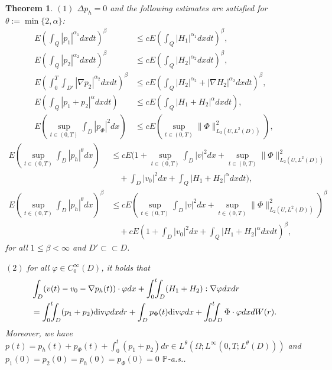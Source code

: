 \documentclass[reqno]{amsart}
\newtheorem{Theorem}{Theorem}[section]
\theoremstyle{definition}
\theoremstyle{remark}
\numberwithin{equation}{section} \allowdisplaybreaks
\begin{document}
\begin{Theorem}
 $(1)$ $\Delta p_h=0$ and the following estimates are satisfied for
$\theta:=\min\{2,\alpha\}$:
\begin{align*} E\left(
\int_Q|p_1|^{\alpha_1}dxdt\right)^\beta&\leq cE\left(
\int_Q|H_1|^{\alpha_1}dxdt\right)^\beta,\\
E\left(\int_Q|p_2|^{\alpha_2}dxdt\right)^\beta&\leq cE\left(
\int_Q|H_2|^{\alpha_2}dxdt\right)^\beta,\\
E\left(\int_0^T\!\!\!\int_{D'}|\nabla
p_2|^{\alpha_2}dxdt\right)^\beta&\leq cE\left(
\int_Q|H_2|^{\alpha_2}+|\nabla H_2|^{\alpha_2}dxdt\right)^\beta,\\
E\left(\int_Q|p_1+p_2|^{\alpha}dxdt\right)&\leq cE\left(
\int_Q|H_1+H_2|^{\alpha}dxdt\right),\\
E\left(\sup_{t\in(0,T)} \int_{D}|p_\Phi|^{2}dx\right)&\leq cE\left(
\sup_{t\in(0,T)}\|\Phi\|^2_{L_2({U},L^2(D))}\right),
\end{align*}
\begin{align*}
E\left(\sup_{t\in(0,T)} \int_{D}|p_h|^{\theta}dx\right)&\leq
cE\bigg( 1+\sup_{t\in(0,T)} \int_{D}|v|^{2}dx
+\sup_{t\in(0,T)}\|\Phi\|^2_{L_2({U},L^2(D))}\\
&\quad+\int_{D}|v_0|^{2}dx+\int_Q|H_1+H_2|^{\alpha}dxdt\bigg),\\
E\left(\sup_{t\in(0,T)} \int_{D}|p_h|^{\theta}dx\right)^\beta&\leq
cE\left(\sup_{t\in(0,T)} \int_{D}|v|^{2}dx
+\sup_{t\in(0,T)}\|\Phi\|^2_{L_2({U},L^2(D))}\right)^\beta\\
&\quad+cE\left(1+\int_{D}|v_0|^{2}dx+\int_Q|H_1+H_2|^{\alpha}dxdt\right)^\beta,
\end{align*}
for all $1\leq\beta<\infty$ and $D'\subset\subset D$.

$(2)$ for all $\varphi\in C_0^\infty(D)$, it holds that
\begin{equation*}
\begin{split}
&\int_{D}(v(t)-v_0-\nabla p_h(t))\cdot\varphi dx+\int_0^t\!\!\!\int_{D}(H_1+H_2):\nabla\varphi dxdr\\
&=\int_0^t\!\!\!\int_{D}(p_1+p_2){\rm{div}\varphi}
dxdr+\int_{D}p_\Phi(t){\rm{div}\varphi}
dx+\int_0^t\!\!\!\int_{D}\Phi \cdot\varphi dxdW(r).
\end{split}
\end{equation*}
Moreover, we have $p(t)=p_h(t)+p_\Phi(t)+\int_0^t(p_1+p_2)dr\in
L^\theta(\Omega;L^\infty(0,T;L^\theta(D)))$ and
$p_1(0)=p_2(0)=p_h(0)=p_\Phi(0)=0$ $\mathbb{P}$-a.s..
\end{Theorem}
\end{document}
